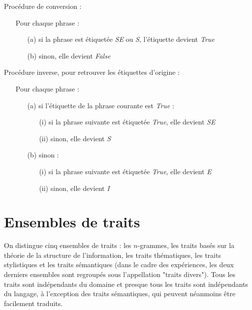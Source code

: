 Procédure de conversion :

\begin{itemize}
    \item[] Pour chaque phrase :
    \begin{itemize}
        \item[(a)] si la phrase est étiquetée \textit{SE} ou \textit{S}, l'étiquette devient \textit{True}
        \item[(b)] sinon, elle devient \textit{False}
    \end{itemize}
\end{itemize}

Procédure inverse, pour retrouver les étiquettes d'origine :

\begin{itemize}
    \item[] Pour chaque phrase :
    \begin{itemize}
        \item[(a)] si l'étiquette de la phrase courante est \textit{True} :
	    \begin{itemize}
	        \item[(i)] si la phrase suivante est étiquetée \textit{True}, elle devient \textit{SE}
	        \item[(ii)] sinon, elle devient \textit{S}
	    \end{itemize}
        \item[(b)] sinon :
	    \begin{itemize}
	        \item[(i)] si la phrase suivante est étiquetée \textit{True}, elle devient \textit{E}
	        \item[(ii)] sinon, elle devient \textit{I}
	    \end{itemize}
    \end{itemize}
\end{itemize}

\section{Ensembles de traits}

On distingue cinq ensembles de traits : les $n$-grammes, les traits basés sur la théorie de la structure de l'information, les traits thématiques, les traits stylistiques et les traits sémantiques (dans le cadre des expériences, les deux derniers ensembles sont regroupés sous l’appellation "traits divers"). Tous les traits sont indépendants du domaine et presque tous les traits sont indépendants du langage, à l'exception des traits sémantiques, qui peuvent néanmoins être facilement traduits.

